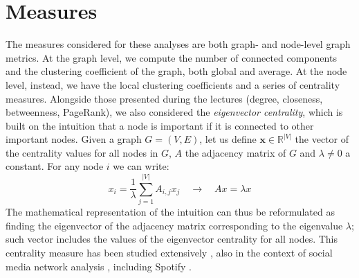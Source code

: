 \section{Measures} \label{sec:measures}

The measures considered for these analyses are both graph- and node-level graph metrics. At the graph level, we compute the number of connected components and the clustering coefficient of the graph, both global and average. At the node level, instead, we have the local clustering coefficients and a series of centrality measures. Alongside those presented during the lectures (degree, closeness, betweenness, PageRank), we also considered the \emph{eigenvector centrality}, which is built on the intuition that a node is important if it is connected to other important nodes. Given a graph $G=(V,E)$, let us define $\textbf{x}\in\mathbb{R}^{|V|}$ the vector of the centrality values for all nodes in $G$, $A$ the adjacency matrix of $G$ and $\lambda\neq 0$ a constant. For any node $i$ we can write: $$x_i=\frac{1}{\lambda}\sum_{j=1}^{|V|}A_{i,j}x_j \quad \rightarrow \quad Ax=\lambda x$$
The mathematical representation of the intuition can thus be reformulated as finding the eigenvector of the adjacency matrix corresponding to the eigenvalue $\lambda$; such vector includes the values of the eigenvector centrality for all nodes. This centrality measure has been studied extensively \cite{Bonacich2007} \cite{Borgatti2006} \cite{Spizzirri2011}, also in the context of social media network analysis \cite{Maharani2014}, including Spotify \cite{South2021} \cite{South2018}.  